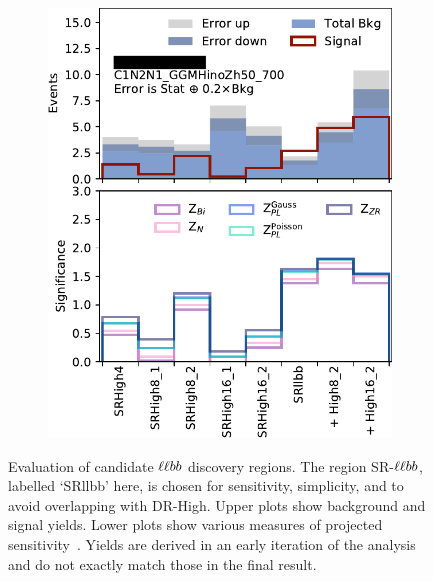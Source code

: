 \begin{figure}[tp]
\begin{subfigure}{0.48\textwidth}
\includegraphics[width=\textwidth]{figures/2ljets_disco_llbb_C1N2N1_GGMHinoZh50_700.png}
\caption{}
\end{subfigure}
\caption[
Evaluation of candidate $\llbb$ discovery regions
]{%
Evaluation of candidate $\llbb$ discovery regions.
The region SR-$\llbb$, labelled `SRllbb' here, is chosen for
sensitivity, simplicity, and to avoid overlapping with DR-High.
Upper plots show background and signal yields.
Lower plots show various measures of projected
sensitivity~\cite{cousins2008evaluation}.
Yields are derived in an early iteration of the analysis and do not exactly
match those in the final result.
}
\label{fig:2ljets_disco_trials_llbb}
\end{figure}


